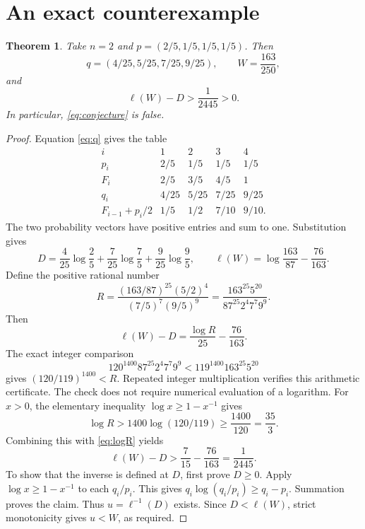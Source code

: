\documentclass[11pt,a4paper]{article}
\newtheorem{theorem}{Theorem}
\begin{document}
\section{An exact counterexample}
\begin{theorem}\label{thm:finite}
Take $n=2$ and $p=(2/5,1/5,1/5,1/5)$. Then
\[
 q=(4/25,5/25,7/25,9/25),\qquad W=\frac{163}{250},
\]
and
\begin{equation}\label{eq:gap}
 \ell(W)-D>\frac1{2445}>0.
\end{equation}
In particular, \eqref{eq:conjecture} is false.
\end{theorem}
\begin{proof}
Equation \eqref{eq:q} gives the table
\[
\begin{array}{c|cccc}
 i&1&2&3&4\\\hline
 p_i&2/5&1/5&1/5&1/5\\
 F_i&2/5&3/5&4/5&1\\
 q_i&4/25&5/25&7/25&9/25\\
 F_{i-1}+p_i/2&1/5&1/2&7/10&9/10.
\end{array}
\]
The two probability vectors have positive entries and sum to one. Substitution gives
\[
 D=\frac4{25}\log\frac25+\frac7{25}\log\frac75+\frac9{25}\log\frac95,
 \qquad \ell(W)=\log\frac{163}{87}-\frac{76}{163}.
\]
Define the positive rational number
\[
 R=\frac{(163/87)^{25}(5/2)^4}{(7/5)^7(9/5)^9}
   =\frac{163^{25}5^{20}}{87^{25}2^4 7^7 9^9}.
\]
Then
\begin{equation}\label{eq:logR}
 \ell(W)-D=\frac{\log R}{25}-\frac{76}{163}.
\end{equation}
The exact integer comparison
\begin{equation}\label{eq:integer}
 120^{1400}87^{25}2^4 7^7 9^9
 <119^{1400}163^{25}5^{20}
\end{equation}
gives $(120/119)^{1400}<R$. Repeated integer multiplication verifies this arithmetic certificate. The check does not require numerical evaluation of a logarithm.
For $x>0$, the elementary inequality $\log x\geq1-x^{-1}$ gives
\[
 \log R>1400\log(120/119)\geq\frac{1400}{120}=\frac{35}{3}.
\]
Combining this with \eqref{eq:logR} yields
\[
 \ell(W)-D>\frac7{15}-\frac{76}{163}=\frac1{2445}.
\]
To show that the inverse is defined at $D$, first prove $D\geq0$. Apply $\log x\geq1-x^{-1}$ to each $q_i/p_i$. This gives $q_i\log(q_i/p_i)\geq q_i-p_i$. Summation proves the claim. Thus $u=\ell^{-1}(D)$ exists. Since $D<\ell(W)$, strict monotonicity gives $u<W$, as required.
\end{proof}
\end{document}

